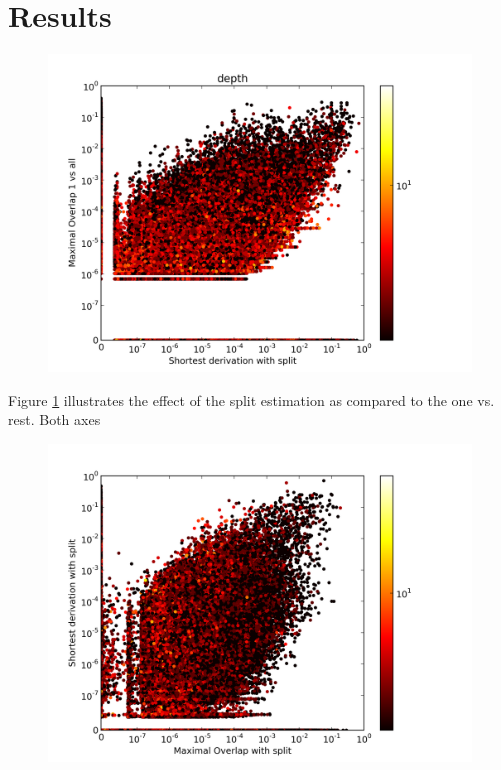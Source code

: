 \section{Results}\label{sec:Results}

\begin{figure}
\center
\includegraphics[width=\linewidth]{../data/plots/plot32.png}
\label{ddop-ddops-depth}
\end{figure}

Figure \ref{ddop-ddops-depth} illustrates the effect of the split estimation as compared to the one vs. rest. Both axes 


\begin{figure}
\center
\includegraphics[width=\linewidth]{../data/plots/plot1.png}
\end{figure}


